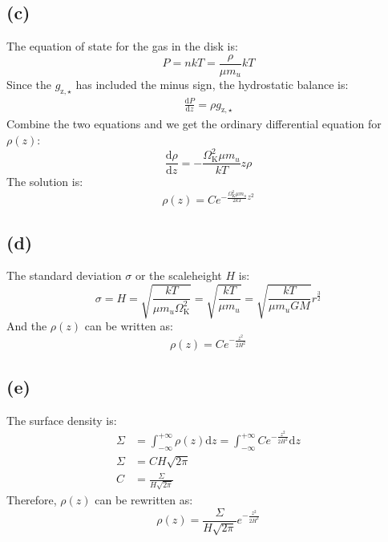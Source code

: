 \documentclass[a4paper,12pt]{article}
\begin{document}
\subsection*{(c)}
The equation of state for the gas in the disk is:
\begin{equation*}
    P = nkT = \frac{\rho}{\mu m_u} kT
\end{equation*}
Since the $g_{\text{z}, \star}$ has included the minus sign, the hydrostatic balance is:
\begin{align*}
    \frac{\text{d} P}{\text{d} z} = \rho g_{\text{z}, \star}
\end{align*}
Combine the two equations and we get the ordinary differential equation for $\rho(z)$:
\begin{equation*}
    \frac{\text{d} \rho}{\text{d} z} = - \frac{\Omega^2_\text{K} \mu m_u}{kT} z \rho
\end{equation*}
The solution is:
\begin{equation*}
    \rho(z) = C e^{-\frac{\Omega^2_\text{K} \mu m_u}{2kT} z^2}
\end{equation*}

\subsection*{(d)}
The standard deviation $\sigma$ or the scaleheight $H$ is:
\begin{equation*}
    \sigma = H = \sqrt{\frac{kT}{\mu m_u \Omega^2_\text{K}}} = \sqrt{\frac{kT}{\mu m_u}} = \sqrt{\frac{kT}{\mu m_u G M}} r^{\frac{3}{2}}
\end{equation*}
And the $\rho(z)$ can be written as:
\begin{equation*}
    \rho(z) = C e^{-\frac{z^2}{2 H^2}}
\end{equation*}

\subsection*{(e)}
The surface density is:
\begin{align*}
    \Sigma &= \int_{-\infty}^{+\infty} \rho(z) \text{d}z = \int_{-\infty}^{+\infty} C e^{-\frac{z^2}{2 H^2}} \text{d}z \\
    \Sigma &= C H \sqrt{2\pi} \\
    C &= \frac{\Sigma}{H \sqrt{2\pi}}
\end{align*}
Therefore, $\rho(z)$ can be rewritten as:
\begin{equation*}
    \rho(z) = \frac{\Sigma}{H \sqrt{2\pi}} e^{-\frac{z^2}{2 H^2}}
\end{equation*}
\end{document}
